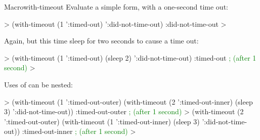 \documentclass[10pt,twoside,english,pdftex]{article}
\begin{document}
\begin{functiondoc}{Macro}{with-timeout}{%
    }
\fnexamples
Evaluate a simple form, with a one-second time out:
%
\W\supp
\begin{example}
  > (with-timeout (1 ':timed-out) 
       ':did-not-time-out)
  :did-not-time-out
  >
\end{example}
%
Again, but this time sleep for two seconds to cause a time out:
%
\W\supp\notpretop
\begin{example}
  > (with-timeout (1 ':timed-out)
       (sleep 2) 
       ':did-not-time-out)
  :timed-out              \textrm{\textcolor{green}{; (after 1 second)}}
  >
\end{example}
%
Uses of  can be nested:
%
\W\supp\notpretop
\begin{example}
  > (with-timeout (1 ':timed-out-outer)
       (with-timeout (2 ':timed-out-inner)
          (sleep 3)
          ':did-not-time-out))
  :timed-out-outer        \textrm{\textcolor{green}{; (after 1 second)}}
  > (with-timeout (2 ':timed-out-outer)
       (with-timeout (1 ':timed-out-inner)
          (sleep 3)
          ':did-not-time-out))
  :timed-out-inner        \textrm{\textcolor{green}{; (after 1 second)}}
  >
\end{example}

\end{functiondoc}

\end{document}
